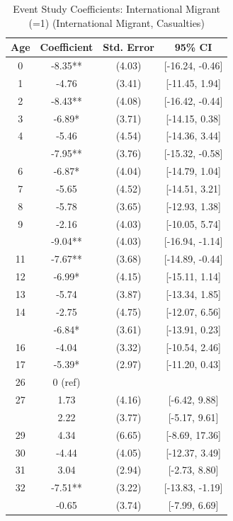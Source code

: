 \begin{table}[!h]
\centering
\caption{\label{tab:event_study_8a_intl_migrant_casualties}Event Study Coefficients: International Migrant (=1) (International Migrant, Casualties)}
\centering
\fontsize{9}{11}\selectfont
\begin{threeparttable}
\begin{tabular}[t]{cccc}
\toprule
Age & Coefficient & Std. Error & 95\% CI\\
\midrule
0 & -8.35** & (4.03) & {}[-16.24, -0.46]\\
1 & -4.76 & (3.41) & {}[-11.45, 1.94]\\
2 & -8.43** & (4.08) & {}[-16.42, -0.44]\\
3 & -6.89* & (3.71) & {}[-14.15, 0.38]\\
4 & -5.46 & (4.54) & {}[-14.36, 3.44]\\
\addlinespace
5 & -7.95** & (3.76) & {}[-15.32, -0.58]\\
6 & -6.87* & (4.04) & {}[-14.79, 1.04]\\
7 & -5.65 & (4.52) & {}[-14.51, 3.21]\\
8 & -5.78 & (3.65) & {}[-12.93, 1.38]\\
9 & -2.16 & (4.03) & {}[-10.05, 5.74]\\
\addlinespace
10 & -9.04** & (4.03) & {}[-16.94, -1.14]\\
11 & -7.67** & (3.68) & {}[-14.89, -0.44]\\
12 & -6.99* & (4.15) & {}[-15.11, 1.14]\\
13 & -5.74 & (3.87) & {}[-13.34, 1.85]\\
14 & -2.75 & (4.75) & {}[-12.07, 6.56]\\
\addlinespace
15 & -6.84* & (3.61) & {}[-13.91, 0.23]\\
16 & -4.04 & (3.32) & {}[-10.54, 2.46]\\
17 & -5.39* & (2.97) & {}[-11.20, 0.43]\\
26 & 0 (ref) &  & \\
27 & 1.73 & (4.16) & {}[-6.42, 9.88]\\
\addlinespace
28 & 2.22 & (3.77) & {}[-5.17, 9.61]\\
29 & 4.34 & (6.65) & {}[-8.69, 17.36]\\
30 & -4.44 & (4.05) & {}[-12.37, 3.49]\\
31 & 3.04 & (2.94) & {}[-2.73, 8.80]\\
32 & -7.51** & (3.22) & {}[-13.83, -1.19]\\
\addlinespace
33 & -0.65 & (3.74) & {}[-7.99, 6.69]\\

\end{tabular}
\end{threeparttable}
\end{table}
